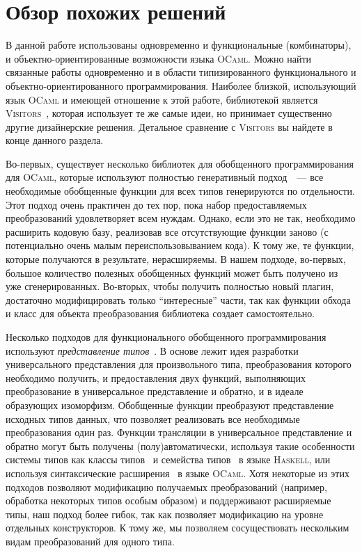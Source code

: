 \section{Обзор похожих решений}
\label{sec:relatedworks}

В данной работе использованы одновременно и функциональные (комбинаторы), и объектно-ориентированные возможности языка \textsc{OCaml}. Можно найти связанные работы  одновременно и в области типизированного функционального и объектно-ориентированного программирования. Наиболее близкой, использующий язык \textsc{OCaml} и имеющей отношение к этой работе, библиотекой является \textsc{Visitors}~\cite{Visitors}, которая использует те же самые идеи, но принимает существенно другие дизайнерские решения. Детальное сравнение с \textsc{Visitors} вы найдете в конце данного раздела.

Во-первых, существует несколько библиотек для обобщенного программирования для \textsc{OCaml}, которые используют полностью генеративный подход~\cite{Yallop,PPXLib}~--- все необходимые обобщенные функции для всех типов генерируются по отдельности. Этот подход очень практичен до тех пор, пока набор предоставляемых преобразований удовлетворяет всем нуждам. Однако, если это не так, необходимо расширить кодовую базу, реализовав все отсутствующие функции заново
(с потенциально очень малым переиспользовыванием кода). К тому же, те функции,
которые получаются в результате, нерасширяемы. В нашем подходе, во-первых,
большое количество полезных обобщенных функций может быть получено из уже сгенерированных. Во-вторых, чтобы получить полностью новый плагин, достаточно модифицировать только ``интересные'' части, так как функции обхода и класс для объекта преобразования библиотека создает самостоятельно.

Несколько подходов для функционального обобщенного программирования используют 
\emph{представление типов}~\cite{Hinze}. В основе лежит идея разработки универсального представления для произвольного типа, преобразования которого необходимо получить, и предоставления двух функций, выполняющих преобразование в универсальное представление и обратно, и в идеале образующих изоморфизм. Обобщенные функции преобразуют представление исходных типов данных, что позволяет реализовать все необходимые преобразования один раз. Функции трансляции в универсальное представление и обратно могут быть получены (полу)автоматически, используя такие особенности системы типов  как классы типов~\cite{Hinze,ALaCarte} и семейства типов~\cite{InstantGenerics} в языке \textsc{Haskell}, или  используя синтаксические расширения~\cite{GenericOCaml} в языке \textsc{OCaml}. Хотя некоторые из этих подходов позволяют модификацию получаемых преобразований (например, обработка некоторых типов особым образом) и поддерживают расширяемые типы, наш подход более гибок, так как позволяет модификацию на уровне отдельных конструкторов. К тому же, мы позволяем сосуществовать нескольким видам преобразований для одного типа.

